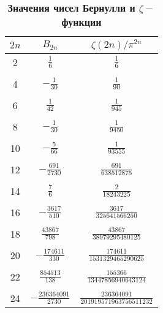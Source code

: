 \begin{table}[]
\caption{\textbf{Значения чисел Бернулли и $\zeta -$функции}}
\begin{center}
\begin{tabular}{|c|c|c|}
\hline
$2n$ & $B_{2n}$ & $\zeta (2n)/ \pi^{2n}$ \\
\hline
2  & $\frac{1}{6}$   & $\frac{1}{6}$ \\
\\
4  & $-\frac{1}{30}$ & $\frac{1}{90}$ \\
\\
6  & $\frac{1}{42}$  & $\frac{1}{945}$ \\
\\
8  & $-\frac{1}{30}$ & $\frac{1}{9450}$ \\
\\
10 & $-\frac{5}{66}$ & $\frac{1}{93555}$ \\
\\
12 & $-\frac{691}{2730}$ & $\frac{691}{638512875}$ \\
\\
14 & $\frac{7}{6}$ & $\frac{2}{18243225}$ \\
\\
16 & $-\frac{3617}{510}$ & $\frac{3617}{325641566250}$ \\
 \\
18 & $\frac{43867}{798}$ & $\frac{43867}{38979295480125}$ \\
\\
20 & $-\frac{174611}{330}$ & $\frac{174611}{1531329465290625}$ \\
\\
22 & $\frac{854513}{138}$ & $\frac{155366}{13447856940643124}$ \\
\\
24 & $-\frac{236364091}{2730}$ & $\frac{236364091}{201919571963756511232}$ \\
\hline
\end{tabular}
\end{center}
\label{table:table_2_2}
\end{table}